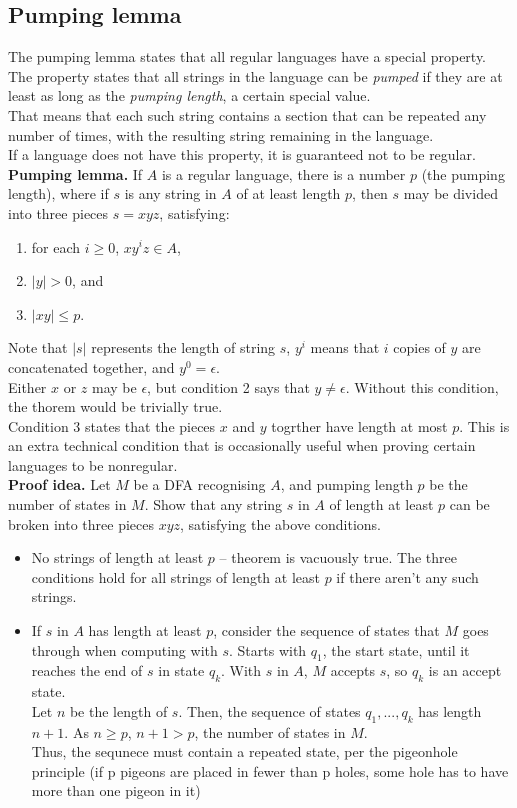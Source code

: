 \documentclass{article}
\begin{document}
\subsection{Pumping lemma}
The pumping lemma states that all regular languages have a special property. The property states that all strings in the language can be \textit{pumped} if they are at least as long as the \textit{pumping length}, a certain special value.\medskip
\\That means that each such string contains a section that can be repeated any number of times, with the resulting string remaining in the language.\medskip
\\If a language does not have this property, it is guaranteed not to be regular.\medskip
\\\textbf{Pumping lemma.} If $A$ is a regular language, there is a number $p$ (the pumping length), where if $s$ is any string in $A$ of at least length $p$, then $s$ may be divided into three pieces $s = xyz$, satisfying:
\begin{enumerate}
	\item for each $i \geq 0$, $xy^iz \in A$,
	\item $|y| > 0$, and
	\item $|xy| \leq p$.
\end{enumerate}
Note that $|s|$ represents the length of string $s$, $y^i$ means that $i$ copies of $y$ are concatenated together, and $y^0 = \epsilon$.\medskip
\\Either $x$ or $z$ may be $\epsilon$, but condition 2 says that $y \neq \epsilon$. Without this condition, the thorem would be trivially true.\medskip
\\Condition 3 states that the pieces $x$ and $y$ togrther have length at most $p$. This is an extra technical condition that is occasionally useful when proving certain languages to be nonregular.\medskip
\\\textbf{Proof idea.} Let $M$ be a DFA recognising $A$, and pumping length $p$ be the number of states in $M$. Show that any string $s$ in $A$ of length at least $p$ can be broken into three pieces $xyz$, satisfying the above conditions.
\begin{itemize}
	\item No strings of length at least $p$ -- theorem is vacuously true. The three conditions hold for all strings of length at least $p$ if there aren't any such strings.
	\item If $s$ in $A$ has length at least $p$, consider the sequence of states that $M$ goes through when computing with $s$. Starts with $q_1$, the start state, until it reaches the end of $s$ in state $q_k$. With $s$ in $A$, $M$ accepts $s$, so $q_k$ is an accept state.
	\\ Let $n$ be the length of $s$. Then, the sequence of states $q_1, ..., q_k$ has length $n+1$. As $n \geq p$, $n+1 > p$, the number of states in $M$.
	\\ Thus, the sequnece must contain a repeated state, per the pigeonhole principle (if p pigeons are placed in fewer than p holes, some hole has to have more than one pigeon in it)
\end{itemize}
\end{document}

